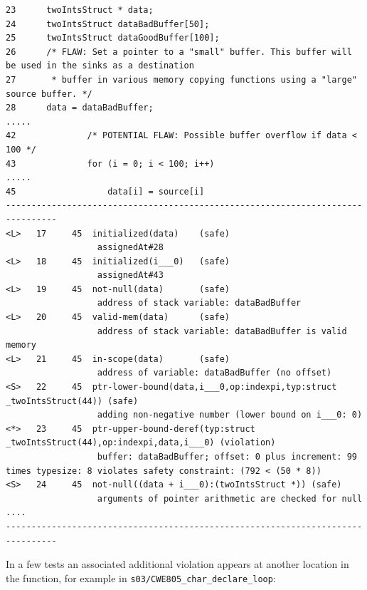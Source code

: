 \documentclass[11pt]{article}
\begin{document}
\begin{tiny}
\begin{verbatim}
23      twoIntsStruct * data;
24      twoIntsStruct dataBadBuffer[50];
25      twoIntsStruct dataGoodBuffer[100];
26      /* FLAW: Set a pointer to a "small" buffer. This buffer will be used in the sinks as a destination
27       * buffer in various memory copying functions using a "large" source buffer. */
28      data = dataBadBuffer;
.....
42              /* POTENTIAL FLAW: Possible buffer overflow if data < 100 */
43              for (i = 0; i < 100; i++)
.....
45                  data[i] = source[i]
--------------------------------------------------------------------------------
<L>   17     45  initialized(data)    (safe)
                  assignedAt#28
<L>   18     45  initialized(i___0)   (safe)
                  assignedAt#43
<L>   19     45  not-null(data)       (safe)
                  address of stack variable: dataBadBuffer
<L>   20     45  valid-mem(data)      (safe)
                  address of stack variable: dataBadBuffer is valid memory
<L>   21     45  in-scope(data)       (safe)
                  address of variable: dataBadBuffer (no offset)
<S>   22     45  ptr-lower-bound(data,i___0,op:indexpi,typ:struct _twoIntsStruct(44)) (safe)
                  adding non-negative number (lower bound on i___0: 0)
<*>   23     45  ptr-upper-bound-deref(typ:struct _twoIntsStruct(44),op:indexpi,data,i___0) (violation)
                  buffer: dataBadBuffer; offset: 0 plus increment: 99 times typesize: 8 violates safety constraint: (792 < (50 * 8))
<S>   24     45  not-null((data + i___0):(twoIntsStruct *)) (safe)
                  arguments of pointer arithmetic are checked for null
....
--------------------------------------------------------------------------------
\end{verbatim}
\end{tiny}

In a few tests an associated additional violation appears at another location
in the function, for example in {\tt s03/CWE805\_char\_declare\_loop}:
\end{document}
